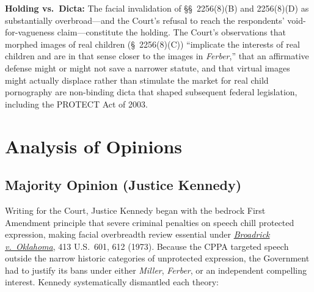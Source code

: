 \documentclass[12pt]{article}
\begin{document}
\textbf{Holding vs.\ Dicta:} The facial invalidation of \S\S~2256(8)(B) and 2256(8)(D) as substantially overbroad---and the Court's refusal to reach the respondents' void-for-vagueness claim---constitute the holding. The Court's observations that morphed images of real children (\S~2256(8)(C)) ``implicate the interests of real children and are in that sense closer to the images in \textit{Ferber},'' that an affirmative defense might or might not save a narrower statute, and that virtual images might actually displace rather than stimulate the market for real child pornography are non-binding dicta that shaped subsequent federal legislation, including the PROTECT Act of 2003.

\section{Analysis of Opinions}

\subsection{Majority Opinion (Justice Kennedy)}

Writing for the Court, Justice Kennedy began with the bedrock First Amendment principle that severe criminal penalties on speech chill protected expression, making facial overbreadth review essential under \href{https://supreme.justia.com/cases/federal/us/413/601/}{\textit{Broadrick v.\ Oklahoma}}, 413 U.S.\ 601, 612 (1973). Because the CPPA targeted speech outside the narrow historic categories of unprotected expression, the Government had to justify its bans under either \textit{Miller}, \textit{Ferber}, or an independent compelling interest. Kennedy systematically dismantled each theory:
\end{document}
